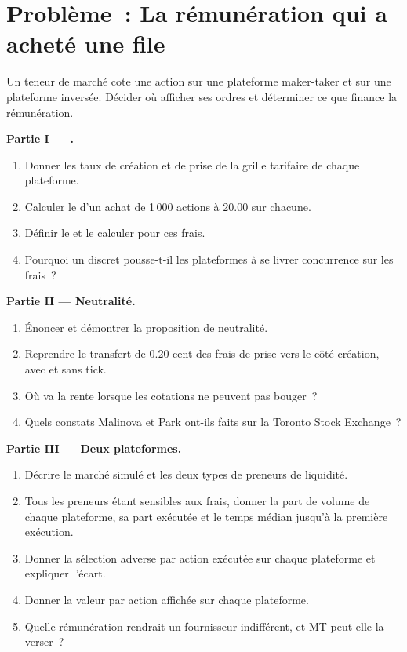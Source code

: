 \section{Problème~: La rémunération qui a acheté une file}

\begin{problem}\label{pb:mx:fees-rebates-and-venue-economics:1}
Un teneur de marché cote une action sur une plateforme maker-taker et sur une plateforme inversée. Décider où afficher ses ordres et déterminer ce que finance la rémunération.

\medskip\noindent\textbf{Partie I --- .}
\begin{enumerate}
\item Donner les taux de création et de prise de la grille tarifaire de chaque plateforme.
\item Calculer le  d'un achat de 1\,000 actions à 20.00 sur chacune.
\item Définir le  et le calculer pour ces frais.
\item Pourquoi un  discret pousse-t-il les plateformes à se livrer concurrence sur les frais~?
\end{enumerate}

\medskip\noindent\textbf{Partie II --- Neutralité.}
\begin{enumerate}[resume]
\item Énoncer et démontrer la proposition de neutralité.
\item Reprendre le transfert de 0.20 cent des frais de prise vers le côté création, avec et sans tick.
\item Où va la rente lorsque les cotations ne peuvent pas bouger~?
\item Quels constats Malinova et Park ont-ils faits sur la Toronto Stock Exchange~?
\end{enumerate}

\medskip\noindent\textbf{Partie III --- Deux plateformes.}
\begin{enumerate}[resume]
\item Décrire le marché simulé et les deux types de preneurs de liquidité.
\item Tous les preneurs étant sensibles aux frais, donner la part de volume de chaque plateforme, sa part exécutée et le temps médian jusqu'à la première exécution.
\item Donner la sélection adverse par action exécutée sur chaque plateforme et expliquer l'écart.
\item Donner la valeur par action affichée sur chaque plateforme.
\item Quelle rémunération rendrait un fournisseur indifférent, et MT peut-elle la verser~?
\end{enumerate}


\end{problem}
